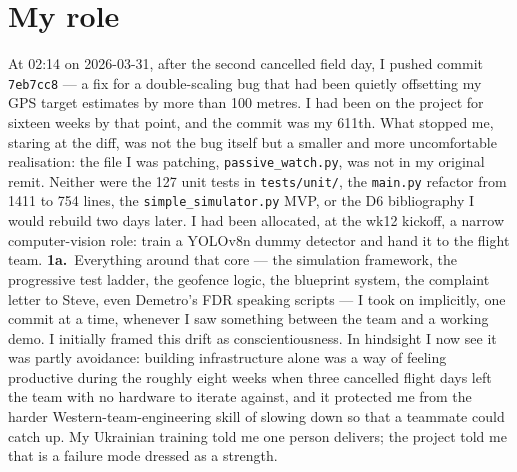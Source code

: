 \section{My role}

At 02:14 on 2026-03-31, after the second cancelled field day, I pushed commit \texttt{7eb7cc8} --- a fix for a double-scaling bug that had been quietly offsetting my GPS target estimates by more than 100 metres. I had been on the project for sixteen weeks by that point, and the commit was my 611th. What stopped me, staring at the diff, was not the bug itself but a smaller and more uncomfortable realisation: the file I was patching, \texttt{passive\_watch.py}, was not in my original remit. Neither were the 127 unit tests in \texttt{tests/unit/}, the \texttt{main.py} refactor from 1411 to 754 lines, the \texttt{simple\_simulator.py} MVP, or the D6 bibliography I would rebuild two days later. I had been allocated, at the wk12 kickoff, a narrow computer-vision role: train a YOLOv8n dummy detector and hand it to the flight team. \textbf{1a.}~Everything around that core --- the simulation framework, the progressive test ladder, the geofence logic, the blueprint system, the complaint letter to Steve, even Demetro's FDR speaking scripts \cite{Hatton1995} --- I took on implicitly, one commit at a time, whenever I saw something between the team and a working demo. I initially framed this drift as conscientiousness. In hindsight I now see it was partly avoidance: building infrastructure alone was a way of feeling productive during the roughly eight weeks when three cancelled flight days left the team with no hardware to iterate against, and it protected me from the harder Western-team-engineering skill of slowing down so that a teammate could catch up. My Ukrainian training told me one person delivers; the project told me that is a failure mode dressed as a strength.

